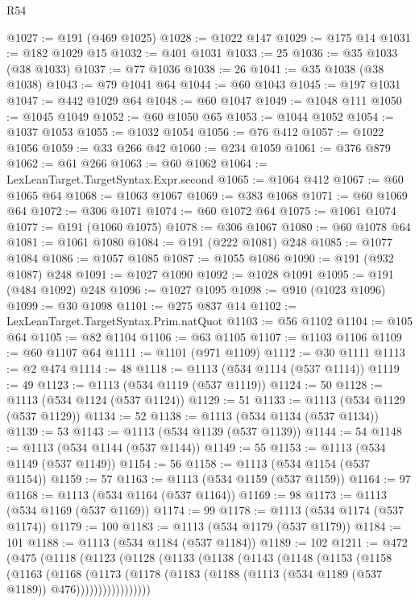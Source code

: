 \begin{lexlean}{R54}
\begin{coremodule}
@1027 := @191 (@469 @1025)
@1028 := @1022 @147
@1029 := @175 @14
@1031 := @182 @1029 @15
@1032 := @401 @1031
@1033 := 25
@1036 := @35 @1033 (@38 @1033)
@1037 := @77 @1036
@1038 := 26
@1041 := @35 @1038 (@38 @1038)
@1043 := @79 @1041 @64
@1044 := @60 @1043
@1045 := @197 @1031
@1047 := @442 @1029 @64
@1048 := @60 @1047
@1049 := @1048 @111
@1050 := @1045 @1049
@1052 := @60 @1050 @65
@1053 := @1044 @1052
@1054 := @1037 @1053
@1055 := @1032 @1054
@1056 := @76 @412
@1057 := @1022 @1056
@1059 := @33 @266 @42
@1060 := @234 @1059
@1061 := @376 @879
@1062 := @61 @266
@1063 := @60 @1062
@1064 := LexLeanTarget.TargetSyntax.Expr.second
@1065 := @1064 @412
@1067 := @60 @1065 @64
@1068 := @1063 @1067
@1069 := @383 @1068
@1071 := @60 @1069 @64
@1072 := @306 @1071
@1074 := @60 @1072 @64
@1075 := @1061 @1074
@1077 := @191 (@1060 @1075)
@1078 := @306 @1067
@1080 := @60 @1078 @64
@1081 := @1061 @1080
@1084 := @191 (@222 @1081) @248
@1085 := @1077 @1084
@1086 := @1057 @1085
@1087 := @1055 @1086
@1090 := @191 (@932 @1087) @248
@1091 := @1027 @1090
@1092 := @1028 @1091
@1095 := @191 (@484 @1092) @248
@1096 := @1027 @1095
@1098 := @910 (@1023 @1096)
@1099 := @30 @1098
@1101 := @275 @837 @14
@1102 := LexLeanTarget.TargetSyntax.Prim.natQuot
@1103 := @56 @1102
@1104 := @105 @64
@1105 := @82 @1104
@1106 := @63 @1105
@1107 := @1103 @1106
@1109 := @60 @1107 @64
@1111 := @1101 (@971 @1109)
@1112 := @30 @1111
@1113 := @2 @474
@1114 := 48
@1118 := @1113 (@534 @1114 (@537 @1114))
@1119 := 49
@1123 := @1113 (@534 @1119 (@537 @1119))
@1124 := 50
@1128 := @1113 (@534 @1124 (@537 @1124))
@1129 := 51
@1133 := @1113 (@534 @1129 (@537 @1129))
@1134 := 52
@1138 := @1113 (@534 @1134 (@537 @1134))
@1139 := 53
@1143 := @1113 (@534 @1139 (@537 @1139))
@1144 := 54
@1148 := @1113 (@534 @1144 (@537 @1144))
@1149 := 55
@1153 := @1113 (@534 @1149 (@537 @1149))
@1154 := 56
@1158 := @1113 (@534 @1154 (@537 @1154))
@1159 := 57
@1163 := @1113 (@534 @1159 (@537 @1159))
@1164 := 97
@1168 := @1113 (@534 @1164 (@537 @1164))
@1169 := 98
@1173 := @1113 (@534 @1169 (@537 @1169))
@1174 := 99
@1178 := @1113 (@534 @1174 (@537 @1174))
@1179 := 100
@1183 := @1113 (@534 @1179 (@537 @1179))
@1184 := 101
@1188 := @1113 (@534 @1184 (@537 @1184))
@1189 := 102
@1211 := @472
    (@475
      (@1118
        (@1123
          (@1128
            (@1133
              (@1138
                (@1143
                  (@1148
                    (@1153
                      (@1158
                        (@1163
                          (@1168
                            (@1173
                              (@1178
                                (@1183 (@1188 (@1113 (@534 @1189 (@537 @1189)) @476)))))))))))))))))

\end{coremodule}
\end{lexlean}
